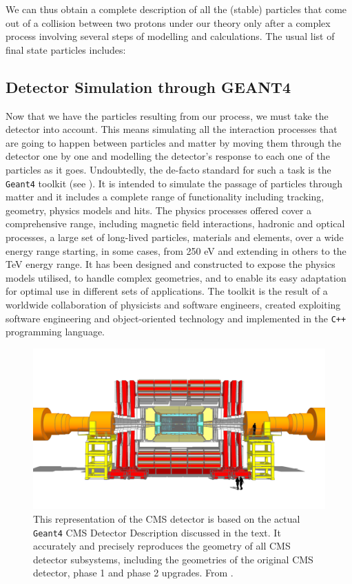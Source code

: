 We can thus obtain a complete description of all the (stable) particles that come out of a collision between two protons under our theory only after a complex process involving several steps of modelling and calculations. The usual list of final state particles includes:


\subsection{Detector Simulation through GEANT4}

Now that we have the particles resulting from our process, we must take the detector into account. This means simulating all the interaction processes that are going to happen between particles and matter by moving them through the detector one by one and modelling the detector’s response to each one of the particles as it goes. 
Undoubtedly, the de-facto standard for such a task is the \texttt{Geant4} toolkit (see \cite{AGOSTINELLI2003250}). It is intended to simulate the passage of particles through matter and it includes a complete range of functionality including tracking, geometry, physics models and hits. The physics processes offered cover a comprehensive range, including magnetic field interactions, hadronic and optical processes, a large set of long-lived particles, materials and elements, over a wide energy range starting, in some cases, from 250 eV and extending in others to the TeV energy range. It has been designed and constructed to expose the physics models utilised, to handle complex geometries, and to enable its easy adaptation for optimal use in different sets of applications. The toolkit is the result of a worldwide collaboration of physicists and software engineers, created exploiting software engineering and object-oriented technology and implemented in the \texttt{C++} programming language.

\begin{figure}
    \centering
     \includegraphics[width=\columnwidth]{gfx/ch2/cms_160518_01_Scene_2.png}
    \caption[CMS model]{ This representation of the CMS detector is based on the actual \texttt{Geant4} CMS Detector Description discussed in the text. It accurately and precisely reproduces the geometry of all CMS detector subsystems, including the geometries of the original CMS detector, phase 1 and phase 2 upgrades.  From \cite{decmod}.}
    \label{fig:decmod}
\end{figure}


